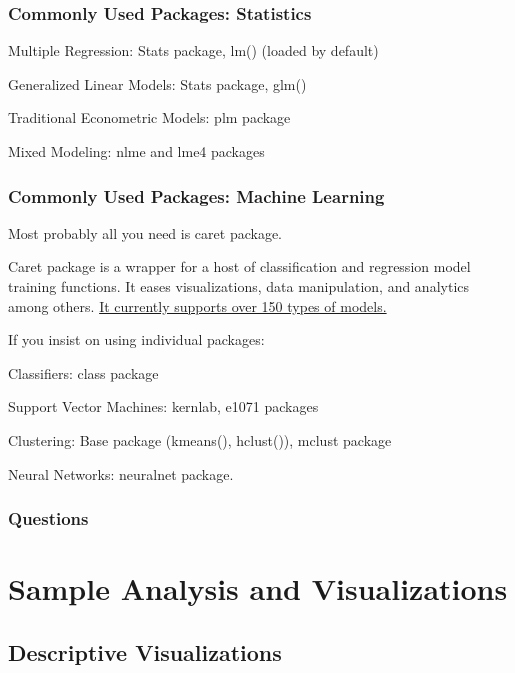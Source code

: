 \documentclass{beamer}\usepackage[]{graphicx}\usepackage[]{color}
\begin{document}
\begin{frame}
\frametitle{Commonly Used Packages: Statistics}

Multiple Regression: Stats package, lm() (loaded by default) \vfill

Generalized Linear Models: Stats package, glm() \vfill

Traditional Econometric Models: plm package \vfill

Mixed Modeling: nlme and lme4 packages \vfill

\end{frame}


\begin{frame}
\frametitle{Commonly Used Packages: Machine Learning}

Most probably all you need is caret package. \vfill

Caret package is a wrapper for a host of classification and regression model training functions. It eases visualizations, data manipulation, and analytics among others. \href{http://topepo.github.io/caret/modelList.html}{It currently supports over 150 types of models.}\vfill 

If you insist on using individual packages:

Classifiers: class package 

Support Vector Machines: kernlab, e1071 packages 

Clustering: Base package (kmeans(), hclust()), mclust package 

Neural Networks: neuralnet package.
\vfill

\end{frame}


\begin{frame}
	\frametitle{Questions}
	\begin{center}
		\vfill
		\vfill
	\end{center}
\end{frame}

\section{Sample Analysis and Visualizations}


\subsection{Descriptive Visualizations}
\end{document}
